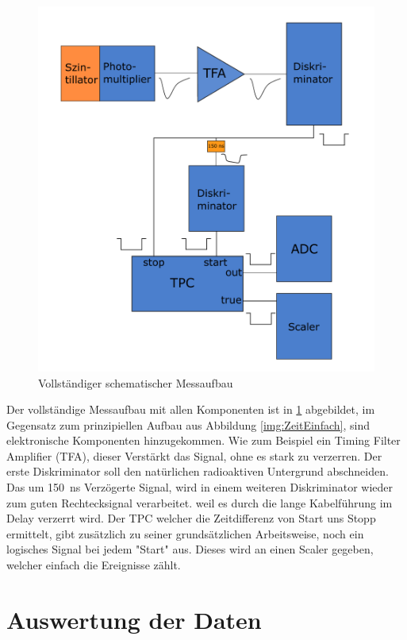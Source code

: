 \documentclass[12pt,a4paper,ngerman]{report}
\begin{document}
	\begin{figure}[ht]
		\centering
		\includegraphics[width=\textwidth]{Bilder/ZeitmessungKomplex.pdf}		
		\caption[schematischer Messaufbau]{Vollständiger schematischer Messaufbau}
		\label{img:ZeitmessungKomplex}
	\end{figure}
	Der vollständige Messaufbau mit allen Komponenten ist in \ref{img:ZeitmessungKomplex} abgebildet, im Gegensatz zum prinzipiellen Aufbau aus Abbildung \ref{img:ZeitEinfach}, sind elektronische Komponenten hinzugekommen. Wie zum Beispiel ein Timing Filter Amplifier (TFA), dieser Verstärkt das Signal, ohne es stark zu verzerren. Der erste Diskriminator soll den natürlichen radioaktiven Untergrund abschneiden. Das um \SI{150}{\nano \second} Verzögerte Signal, wird in einem weiteren Diskriminator wieder zum guten Rechtecksignal verarbeitet. weil es durch die lange Kabelführung im Delay verzerrt wird. Der TPC welcher die Zeitdifferenz von Start uns Stopp ermittelt, gibt zusätzlich zu seiner grundsätzlichen Arbeitsweise, noch ein logisches Signal bei jedem "Start" aus. Dieses wird an einen Scaler gegeben, welcher einfach die Ereignisse zählt.
	
	
	


\chapter{Auswertung der Daten}
\end{document}
